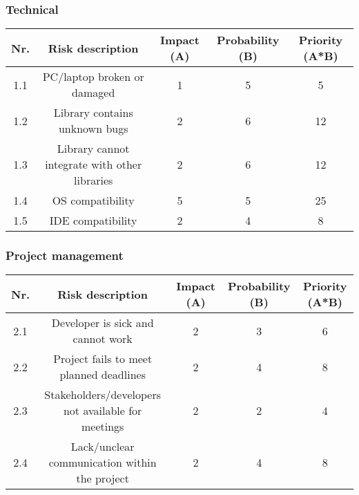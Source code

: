 \documentclass{article} %
\begin{document}
\subsubsection{Technical}

\begin{center}
    \begin{tabular}{|c | c | c | c | c |}
        \hline
        Nr. & Risk description                              & Impact (A) & Probability (B) & Priority (A*B) \\ [0.5ex]
        \hline\hline
        1.1 & PC/laptop broken or damaged                   & 1          & 5               & 5              \\
        \hline
        1.2 & Library contains unknown bugs                 & 2          & 6               & 12             \\
        \hline
        1.3 & Library cannot integrate with other libraries & 2          & 6               & 12             \\
        \hline
        1.4 & OS compatibility                              & 5          & 5               & 25             \\
        \hline
        1.5 & IDE compatibility                             & 2          & 4               & 8              \\
        \hline
    \end{tabular}
\end{center}

\subsubsection{Project management}

\begin{center}
    \begin{tabular}{|c | c | c | c | c |}
        \hline
        Nr. & Risk description                                   & Impact (A) & Probability (B) & Priority (A*B) \\ [0.5ex]
        \hline\hline
        2.1 & Developer is sick and cannot work                  & 2          & 3               & 6              \\
        \hline
        2.2 & Project fails to meet planned deadlines            & 2          & 4               & 8              \\
        \hline
        2.3 & Stakeholders/developers not available for meetings & 2          & 2               & 4              \\
        \hline
        2.4 & Lack/unclear communication within the project      & 2          & 4               & 8              \\
        \hline
    \end{tabular}
\end{center}
\end{document}
